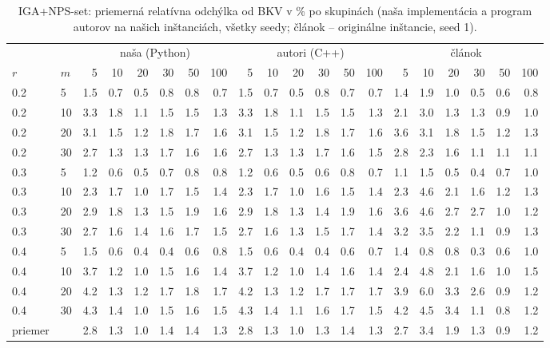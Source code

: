\begin{table}[ht]
\centering
\scriptsize
\setlength{\tabcolsep}{3pt}
\caption{IGA+NPS-set: priemerná relatívna odchýlka od BKV v \% po skupinách (naša implementácia a program autorov na našich inštanciách, všetky seedy; článok – originálne inštancie, seed 1).}
\label{tab:rpd_nps}
\begin{tabular}{ll|rrrrrr|rrrrrr|rrrrrr}
\toprule
 &  & \multicolumn{6}{c}{naša (Python)} & \multicolumn{6}{c}{autori (C++)} & \multicolumn{6}{c}{článok} \\
$r$ & $m$ & 5 & 10 & 20 & 30 & 50 & 100 & 5 & 10 & 20 & 30 & 50 & 100 & 5 & 10 & 20 & 30 & 50 & 100 \\
\midrule
0.2 & 5 & 1.5 & 0.7 & 0.5 & 0.8 & 0.8 & 0.7 & 1.5 & 0.7 & 0.5 & 0.8 & 0.7 & 0.7 & 1.4 & 1.9 & 1.0 & 0.5 & 0.6 & 0.8 \\
0.2 & 10 & 3.3 & 1.8 & 1.1 & 1.5 & 1.5 & 1.3 & 3.3 & 1.8 & 1.1 & 1.5 & 1.5 & 1.3 & 2.1 & 3.0 & 1.3 & 1.3 & 0.9 & 1.0 \\
0.2 & 20 & 3.1 & 1.5 & 1.2 & 1.8 & 1.7 & 1.6 & 3.1 & 1.5 & 1.2 & 1.8 & 1.7 & 1.6 & 3.6 & 3.1 & 1.8 & 1.5 & 1.2 & 1.3 \\
0.2 & 30 & 2.7 & 1.3 & 1.3 & 1.7 & 1.6 & 1.6 & 2.7 & 1.3 & 1.3 & 1.7 & 1.6 & 1.5 & 2.8 & 2.3 & 1.6 & 1.1 & 1.1 & 1.1 \\
0.3 & 5 & 1.2 & 0.6 & 0.5 & 0.7 & 0.8 & 0.8 & 1.2 & 0.6 & 0.5 & 0.6 & 0.8 & 0.7 & 1.1 & 1.5 & 0.5 & 0.4 & 0.7 & 1.0 \\
0.3 & 10 & 2.3 & 1.7 & 1.0 & 1.7 & 1.5 & 1.4 & 2.3 & 1.7 & 1.0 & 1.6 & 1.5 & 1.4 & 2.3 & 4.6 & 2.1 & 1.6 & 1.2 & 1.3 \\
0.3 & 20 & 2.9 & 1.8 & 1.3 & 1.5 & 1.9 & 1.6 & 2.9 & 1.8 & 1.3 & 1.4 & 1.9 & 1.6 & 3.6 & 4.6 & 2.7 & 2.7 & 1.0 & 1.2 \\
0.3 & 30 & 2.7 & 1.6 & 1.4 & 1.6 & 1.7 & 1.5 & 2.7 & 1.6 & 1.3 & 1.5 & 1.7 & 1.4 & 3.2 & 3.5 & 2.2 & 1.1 & 0.9 & 1.3 \\
0.4 & 5 & 1.5 & 0.6 & 0.4 & 0.4 & 0.6 & 0.8 & 1.5 & 0.6 & 0.4 & 0.4 & 0.6 & 0.7 & 1.4 & 0.8 & 0.8 & 0.3 & 0.6 & 1.0 \\
0.4 & 10 & 3.7 & 1.2 & 1.0 & 1.5 & 1.6 & 1.4 & 3.7 & 1.2 & 1.0 & 1.4 & 1.6 & 1.4 & 2.4 & 4.8 & 2.1 & 1.6 & 1.0 & 1.5 \\
0.4 & 20 & 4.2 & 1.3 & 1.2 & 1.7 & 1.8 & 1.7 & 4.2 & 1.3 & 1.2 & 1.7 & 1.7 & 1.7 & 3.9 & 6.0 & 3.3 & 2.6 & 0.9 & 1.2 \\
0.4 & 30 & 4.3 & 1.4 & 1.0 & 1.5 & 1.6 & 1.5 & 4.3 & 1.4 & 1.1 & 1.6 & 1.7 & 1.5 & 4.2 & 4.5 & 3.4 & 1.1 & 0.8 & 1.2 \\
\midrule
priemer &  & 2.8 & 1.3 & 1.0 & 1.4 & 1.4 & 1.3 & 2.8 & 1.3 & 1.0 & 1.3 & 1.4 & 1.3 & 2.7 & 3.4 & 1.9 & 1.3 & 0.9 & 1.2 \\
\bottomrule
\end{tabular}
\end{table}
